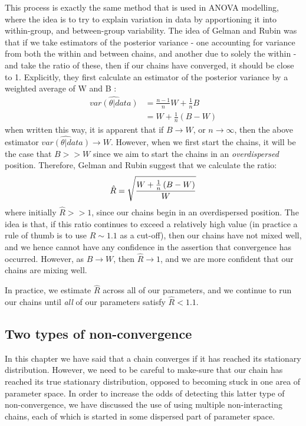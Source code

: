 \documentclass[11pt,fullpage]{book}
\begin{document}
This process is exactly the same method that is used in ANOVA modelling, where the idea is to try to explain variation in data by apportioning it into within-group, and between-group variability. The idea of Gelman and Rubin was that if we take estimators of the posterior variance - one accounting for variance from both the within and between chains, and another due to solely the within - and take the ratio of these, then if our chains have converged, it should be close to 1. Explicitly, they first calculate an estimator of the posterior variance by a weighted average of W and B \cite{gelman2013bayesian}:
%
\begin{align}
\widehat{var(\theta|data)} &= \frac{n-1}{n} W + \frac{1}{n} B\\
&= W + \frac{1}{n} \left(B - W\right)
\end{align}
%
when written this way, it is apparent that if $B\rightarrow W$, or $n\rightarrow\infty$, then the above estimator $\widehat{var(\theta|data)}\rightarrow W$. However, when we first start the chains, it will be the case that $B>>W$ since we aim to start the chains in an \textit{overdispersed} position. Therefore, Gelman and Rubin suggest that we calculate the ratio:
%
\begin{equation}\label{eq:metropolisHastings_Rhat}\index{R hat}
\hat{R} = \sqrt{\frac{W + \frac{1}{n} \left(B - W\right)}{W}}
\end{equation}
%
where initially $\hat{R}>>1$, since our chains begin in an overdispersed position. The idea is that, if this ratio continues to exceed a relatively high value (in practice a rule of thumb is to use $\hat{R}\sim 1.1$ as a cut-off), then our chains have not mixed well, and we hence cannot have any confidence in the assertion that convergence has occurred. However, as $B\rightarrow W$, then $\hat{R}\rightarrow 1$, and we are more confident that our chains are mixing well.

In practice, we estimate $\hat{R}$ across all of our parameters, and we continue to run our chains until \textit{all} of our parameters satisfy $\hat{R} < 1.1$. 

\subsection{Two types of non-convergence}
In this chapter we have said that a chain converges if it has reached its stationary distribution. However, we need to be careful to make-sure that our chain has reached its true stationary distribution, opposed to becoming stuck in one area of parameter space. In order to increase the odds of detecting this latter type of non-convergence, we have discussed the use of using multiple non-interacting chains, each of which is started in some dispersed part of parameter space. 
\end{document}
